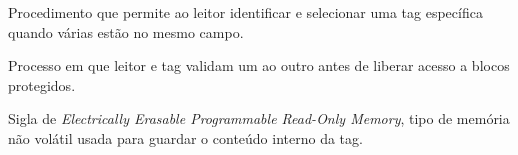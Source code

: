 \begin{description}[
  font=\normalfont\bfseries,
  style=multiline,
  leftmargin=5.6cm,
  labelwidth=4.9cm,
  labelsep=0.35cm,
  itemsep=0.55\baselineskip
]
  \item[Anticolisão] Procedimento que permite ao leitor identificar e selecionar uma tag específica quando várias estão no mesmo campo.
  \item[Autenticação mútua] Processo em que leitor e tag validam um ao outro antes de liberar acesso a blocos protegidos.
  \item[EEPROM] Sigla de \textit{Electrically Erasable Programmable Read-Only Memory}, tipo de memória não volátil usada para guardar o conteúdo interno da tag.
\end{description}
